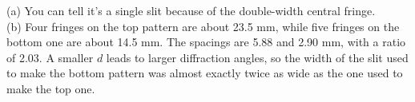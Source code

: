 (a) You can tell it's a single slit because of the
double-width central fringe.\\
%
(b) Four fringes on the top pattern are about 23.5 mm,
while five fringes on the bottom one are about 14.5 mm.
The spacings are 5.88 and 2.90 mm, with a ratio of
2.03. A smaller $d$ leads to larger diffraction angles,
so the width of the slit used to make the bottom pattern
was almost exactly twice as wide as the one used to make the
top one.
